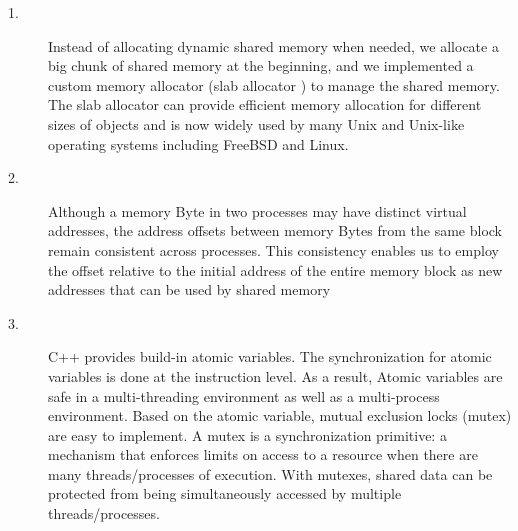 \begin{description}
	\item [1.] Instead of allocating dynamic shared memory when needed, we allocate a big chunk of shared memory at the beginning, and we implemented a custom memory allocator (slab allocator \cite{bonwick1994slab}) to manage the shared memory. The slab allocator can provide efficient memory allocation for different sizes of objects and is now widely used by many Unix and Unix-like operating systems including FreeBSD and Linux.
	\item [2.] Although a memory Byte in two processes may have distinct virtual addresses, the address offsets between memory Bytes from the same block remain consistent across processes. This consistency enables us to employ the offset relative to the initial address of the entire memory block as new addresses that can be used by shared memory
	\item [3.] C++ provides build-in atomic variables. The synchronization for atomic variables is done at the instruction level. As a result, Atomic variables are safe in a multi-threading environment as well as a multi-process environment. Based on the atomic variable, mutual exclusion locks (mutex) are easy to implement. A mutex is a synchronization primitive: a mechanism that enforces limits on access to a resource when there are many threads/processes of execution. With mutexes, shared data can be protected from being simultaneously accessed by multiple threads/processes.

\end{description}

%



